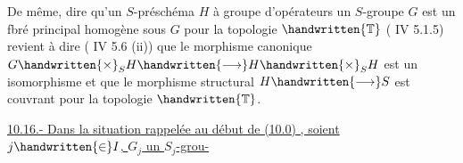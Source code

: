 De même, dire qu'un $S$-préschéma $H$ à groupe d'opérateurs un $S$-groupe $G$ est un fbré principal homogène sous $G$ pour la topologie $\handwritten{\mathbb{T}}$ ( IV 5.1.5) revient à dire ( IV 5.6 (ii)) que le morphisme canonique $G\handwritten{\times}_S H\handwritten{\longrightarrow}H\handwritten{\times}_S H$ est un isomorphisme et que le morphisme structural $H\handwritten{\longrightarrow}S$ est couvrant pour la topologie $\handwritten{\mathbb{T}}$.

\uline{10.16.- Dans la situation rappelée au début de (10.0) , soient $j\handwritten{\in}I$, $G_j$ un $S_j$-grou-}
